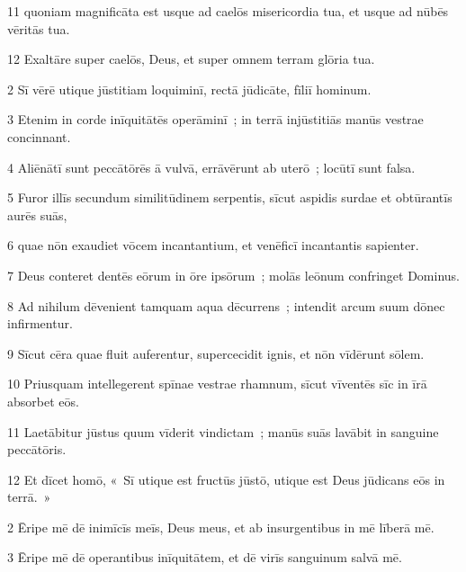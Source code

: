 \psalmVerse
  {\phantom{0}11}
  {quoniam magnificāta est usque ad caelōs misericordia tua, et usque ad nūbēs vēritās tua.}


\psalmVerse
  {\phantom{0}12}
  {Exaltāre super caelōs, Deus, et super omnem terram glōria tua.}



\psalmVerse
  {\phantom{00}2}
  {Sī vērē utique jūstitiam loquiminī, rectā jūdicāte, fīliī hominum.}


\psalmVerse
  {\phantom{00}3}
  {Etenim in corde inīquitātēs operāminī~; in terrā injūstitiās manūs vestrae concinnant.}


\psalmVerse
  {\phantom{00}4}
  {Aliēnātī sunt peccātōrēs ā vulvā, errāvērunt ab uterō~; locūtī sunt falsa.}


\psalmVerse
  {\phantom{00}5}
  {Furor illīs secundum similitūdinem serpentis, sīcut aspidis surdae et obtūrantīs aurēs suās,}


\psalmVerse
  {\phantom{00}6}
  {quae nōn exaudiet vōcem incantantium, et venēficī incantantis sapienter.}


\psalmVerse
  {\phantom{00}7}
  {Deus conteret dentēs eōrum in ōre ipsōrum~; molās leōnum confringet Dominus.}


\psalmVerse
  {\phantom{00}8}
  {Ad nihilum dēvenient tamquam aqua dēcurrens~; intendit arcum suum dōnec infirmentur.}


\psalmVerse
  {\phantom{00}9}
  {Sīcut cēra quae fluit auferentur, supercecidit ignis, et nōn vīdērunt sōlem.}


\psalmVerse
  {\phantom{0}10}
  {Priusquam intellegerent spīnae vestrae rhamnum, sīcut vīventēs sīc in īrā absorbet eōs.}


\psalmVerse
  {\phantom{0}11}
  {Laetābitur jūstus quum vīderit vindictam~; manūs suās lavābit in sanguine peccātōris.}


\psalmVerse
  {\phantom{0}12}
  {Et dīcet homō, «~Sī utique est fructūs jūstō, utique est Deus jūdicans eōs in terrā.~»}




\psalmVerse
  {\phantom{00}2}
  {Ēripe mē dē inimīcīs meīs, Deus meus, et ab insurgentibus in mē līberā mē.}


\psalmVerse
  {\phantom{00}3}
  {Ēripe mē dē operantibus inīquitātem, et dē virīs sanguinum salvā mē.}


